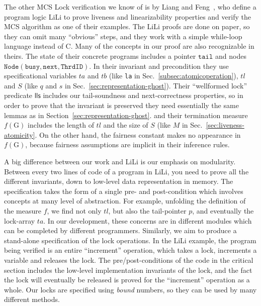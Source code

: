 The other MCS Lock verification we know of is by Liang and
Feng~\cite{lili16}, who define a program logic LiLi to prove
liveness and linearizability properties and verify the MCS algorithm
as one of their examples.  The LiLi proofs are done on paper, so they
can omit many ``obvious'' steps, and they work with a simple
while-loop language instead of C. Many of the concepts in our proof
are also recognizable in theirs. The state of their concrete
  programs includes a pointer $\mathrm{\texttt{tail}}$ and nodes
  $\mathrm{\texttt{Node}}(\mathrm{\texttt{busy}}, \mathrm{\texttt{next}}, \mathrm{\texttt{ThrdID}})$.
In their invariant and precondition they use specificational variables
$\mathrm{\textit{ta}}$ and $\mathrm{\textit{tb}}$ (like \texttt{la} in
Sec.~\ref{subsec:atomicoperation}), $\mathrm{\textit{tl}}$ and $S$ (like $q$
and $s$ in Sec.~\ref{sec:representation-ghost}). Their
  ``wellformed lock'' predicate $\mathrm{\textsf{lls}}$ includes our
  tail-soundness and next-correctness properties, so in order to prove
  that the invariant is preserved they need essentially the same
  lemmas as in Section~\ref{sec:representation-ghost}. and their
termination measure $f(\mathrm{G})$ includes the length of
$\mathit{tl}$ and the size of $S$ (like $M$ in
Sec.~\ref{sec:liveness-atomicity}. On the other hand, the fairness
constant makes no appearance in $f(\mathrm{G})$, because fairness
assumptions are implicit in their inference rules.

A big difference between our work and LiLi is our emphasis on
modularity.  Between every two lines of code of a program in LiLi, you
need to prove all the different invariants, down to low-level data
representation in memory. The specification takes the form of a single
pre- and post-condition which involves concepts at many level of
abstraction. For example, unfolding the definition of the measure $f$,
we find not only $\mathit{tl}$, but also the tail-pointer $p$, and
eventually the lock-array $\mathit{ta}$. In our development, these
concerns are in different modules which can be completed by different
programmers.  Similarly, we aim to produce a stand-alone specification
of the lock operations. In the LiLi example, the program being
verified is an entire ``increment'' operation, which takes a lock,
increments a variable and releases the lock. The pre/post-conditions
of the code in the critical section includes the low-level
implementation invariants of the lock, and the fact the lock will
eventually be released is proved for the ``increment'' operation as a
whole. Our locks are specified using \emph{bound} numbers, so they can
be used by many different methods.

